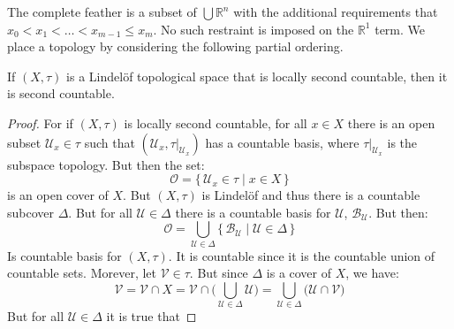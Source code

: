         The complete feather is a subset of $\bigcup\mathbb{R}^{n}$ with the
        additional requirements that $x_{0}<x_{1}<\dots<x_{m-1}\leq{x}_{m}$.
        No such restraint is imposed on the $\mathbb{R}^{1}$ term. We place
        a topology by considering the following partial ordering.
        \begin{theorem}
                If $(X,\tau)$ is a Lindel\"{o}f topological space that is
                locally second countable, then it is second countable.
        \end{theorem}
        \begin{proof}
                For if $(X,\tau)$ is locally second countable, for all $x\in{X}$
                there is an open subset $\mathcal{U}_{x}\in\tau$ such that
                $(\mathcal{U}_{x},\tau|_{\mathcal{U}_{x}})$ has a countable
                basis, where $\tau|_{\mathcal{U}_{x}}$ is the subspace topology.
                But then the set:
                \begin{equation}
                    \mathcal{O}=
                    \{\,\mathcal{U}_{x}\in\tau\;|\;x\in{X}\,\}
                \end{equation}
                is an open cover of $X$. But $(X,\tau)$ is Lindel\"{o}f and thus
                there is a countable subcover $\Delta$. But for all
                $\mathcal{U}\in\Delta$ there is a countable basis for
                $\mathcal{U}$, $\mathscr{B}_{\mathcal{U}}$. But then:
                \begin{equation}
                    \mathscr{O}=
                    \bigcup_{\mathcal{U}\in\Delta}
                        \{\,\mathscr{B}_{\mathcal{U}}\;|\;
                            \mathcal{U}\in\Delta\,\}
                \end{equation}
                Is countable basis for $(X,\tau)$. It is countable since it is
                the countable union of countable sets. Morever, let
                $\mathcal{V}\in\tau$. But since $\Delta$ is a cover of $X$, we
                have:
                \begin{equation}
                    \mathcal{V}
                    =\mathcal{V}\cap{X}
                    =\mathcal{V}\cap\Big(
                        \bigcup_{\mathcal{U}\in\Delta}\mathcal{U}
                    \Big)
                    =\bigcup_{\mathcal{U}\in\Delta}\big(
                        \mathcal{U}\cap\mathcal{V}
                    \big)
                \end{equation}
                But for all $\mathcal{U}\in\Delta$ it is true that

\end{proof}
